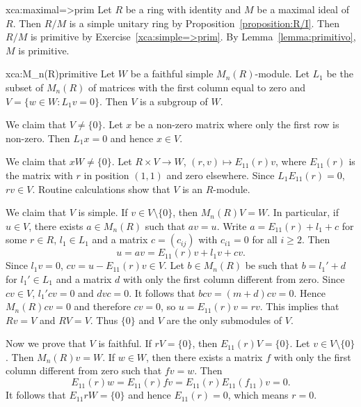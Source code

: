 \begin{sol}{xca:maximal=>prim}
	Let $R$ be a ring with identity and $M$ be a maximal ideal of $R$. Then 
	$R/M$ is a simple unitary ring by 
	Proposition~\ref{proposition:R/I}. Then $R/M$ is primitive by
	Exercise~\ref{xca:simple=>prim}. By Lemma~\ref{lemma:primitivo}, 
	$M$ is primitive. 
\end{sol}

\begin{sol}{xca:M_n(R)primitive}
    Let $W$ be a faithful simple $M_n(R)$-module. Let 
    $L_1$ be the subset of $M_n(R)$ of matrices 
    with the first column equal to zero and 
    $V=\{w\in W:L_1v=0\}$. Then $V$ is a subgroup of $W$. 

    We claim that $V\ne\{0\}$. Let $x$ be 
    a non-zero matrix where only the first row is non-zero. Then 
    $L_1x=0$ and hence $x\in V$. 

    We claim that $xW\ne\{0\}$. 
    Let $R\times V\to W$, $(r,v)\mapsto E_{11}(r)v$, where $E_{11}(r)$ is the matrix 
    with $r$ in position $(1,1)$ and zero elsewhere. Since 
    $L_1E_{11}(r)=0$, $rv\in V$. Routine calculations show
    that $V$ is an $R$-module. 
    
    We claim that $V$ is simple. 
    If $v\in V\setminus\{0\}$, then 
    $M_n(R)V=W$. In particular, if $u\in V$, 
    there exists $a\in M_n(R)$ 
    such that $av=u$. Write $a=E_{11}(r)+l_1+c$ for
    some $r\in R$, $l_1\in L_1$ and a matrix 
    $c=(c_{ij})$ with $c_{i1}=0$ for all $i\geq2$. Then
    \[
    u=av=E_{11}(r)v+l_1v+cv.
    \]
    Since $l_1v=0$, $cv=u-E_{11}(r)v\in V$. Let $b\in M_n(R)$ 
    be such that $b=l_1'+d$ for $l_1'\in L_1$ and a matrix $d$
    with only the first column different from zero. Since $cv\in V$, 
    $l_1'cv=0$ and $dvc=0$. It follows that
    $bcv=(m+d)cv=0$. Hence $M_n(R)cv=0$ and 
    therefore $cv=0$, so $u=E_{11}(r)v=rv$. This implies that 
    $Rv=V$ and $RV=V$. Thus $\{0\}$ and $V$ are the only 
    submodules of $V$. 

    Now we prove that $V$ is faithful. If $rV=\{0\}$, then
    $E_{11}(r)V=\{0\}$. Let $v\in V\setminus\{0\}$. Then
    $M_n(R)v=W$. If $w\in W$, then there exists 
    a matrix $f$ with only the first column different from zero
    such that $fv=w$. Then
    \[
    E_{11}(r)w=E_{11}(r)fv=E_{11}(r)E_{11}(f_{11})v=0.
    \]
    It follows that $E_{11}rW=\{0\}$ and
    hence $E_{11}(r)=0$, which means $r=0$.
\end{sol}
